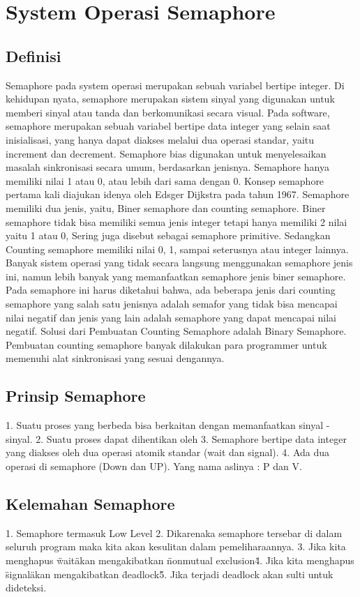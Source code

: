 \section{System Operasi Semaphore}
\subsection{Definisi}
Semaphore pada system operasi merupakan sebuah variabel bertipe integer. Di kehidupan nyata, semaphore merupakan sistem sinyal yang
digunakan untuk memberi sinyal atau tanda dan berkomunikasi secara visual. Pada software, semaphore merupakan sebuah variabel bertipe data
integer yang selain saat inisialisasi, yang hanya dapat diakses melalui dua operasi standar, yaitu increment dan decrement. Semaphore bias
digunakan untuk menyelesaikan masalah sinkronisasi secara umum, berdasarkan jenisnya. Semaphore hanya memiliki nilai 1 atau 0, atau lebih
dari sama dengan 0. Konsep semaphore pertama kali diajukan idenya oleh Edsger Dijkstra pada tahun 1967. Semaphore memiliki dua jenis,
yaitu, Biner semaphore dan counting semaphore. Biner semaphore tidak bisa memiliki semua jenis integer tetapi hanya memiliki 2 nilai yaitu 1 atau 0, Sering juga disebut sebagai semaphore
primitive. Sedangkan Counting semaphore memiliki nilai 0, 1, sampai seterusnya atau integer lainnya. Banyak sistem operasi yang tidak
secara langsung menggunakan semaphore jenis ini, namun lebih banyak yang memanfaatkan semaphore jenis biner semaphore. Pada semaphore ini harus diketahui bahwa, ada beberapa jenis dari counting semaphore yang salah satu jenisnya adalah semafor yang tidak bisa mencapai nilai negatif dan jenis yang lain adalah semaphore yang dapat mencapai nilai negatif. Solusi dari Pembuatan Counting Semaphore adalah Binary Semaphore. Pembuatan counting semaphore banyak dilakukan para programmer untuk memenuhi alat sinkronisasi yang sesuai dengannya. 


\subsection{Prinsip Semaphore}
1. Suatu proses yang berbeda bisa berkaitan dengan memanfaatkan sinyal - sinyal.
2. Suatu proses dapat dihentikan oleh 
3. Semaphore bertipe data integer yang diakses oleh dua operasi atomik standar (wait dan signal).
4. Ada dua operasi di semaphore (Down dan UP). Yang nama aslinya : P dan V.

\subsection{Kelemahan Semaphore}
1. Semaphore termasuk Low Level
2. Dikarenaka semaphore tersebar di dalam seluruh program maka kita akan kesulitan dalam pemeliharaannya.
3. Jika kita menghapus \"wait\" akan mengakibatkan \"nonmutual exclusion\"
4. Jika kita menghapus \"signal\" akan mengakibatkan \"deadlock\"
5. Jika terjadi deadlock akan sulti untuk dideteksi.

